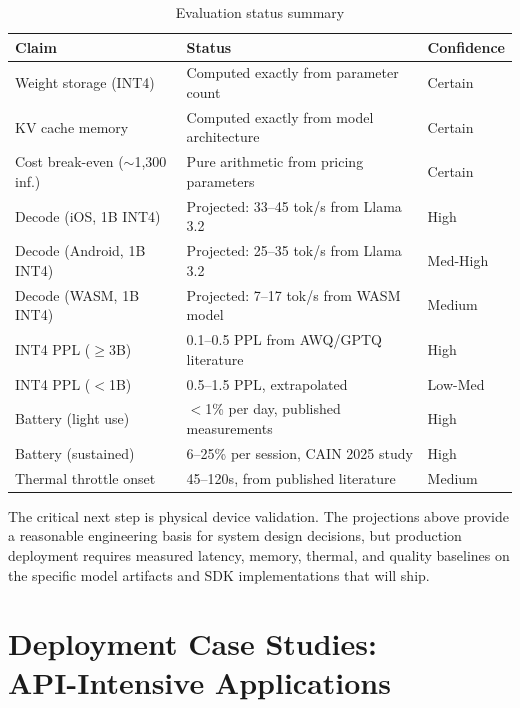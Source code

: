 \documentclass[12pt, letterpaper, twoside]{report}
\begin{document}
\begin{table}[H]
\centering
\caption{Evaluation status summary}
\label{tab:eval_summary}
{\small
\begin{tabular}{@{}p{3.6cm}p{7.0cm}l@{}}
\toprule
\textbf{Claim} & \textbf{Status} & \textbf{Confidence} \\
\midrule
Weight storage (INT4) & Computed exactly from parameter count & Certain \\[2pt]
KV cache memory & Computed exactly from model architecture & Certain \\[2pt]
Cost break-even (${\sim}$1,300 inf.) & Pure arithmetic from pricing parameters & Certain \\[2pt]
Decode (iOS, 1B INT4) & Projected: 33--45 tok/s from Llama 3.2 & High \\[2pt]
Decode (Android, 1B INT4) & Projected: 25--35 tok/s from Llama 3.2 & Med-High \\[2pt]
Decode (WASM, 1B INT4) & Projected: 7--17 tok/s from WASM model & Medium \\[2pt]
INT4 PPL (${\geq}$3B) & 0.1--0.5 PPL from AWQ/GPTQ literature & High \\[2pt]
INT4 PPL (${<}$1B) & 0.5--1.5 PPL, extrapolated & Low-Med \\[2pt]
Battery (light use) & ${<}$1\% per day, published measurements & High \\[2pt]
Battery (sustained) & 6--25\% per session, CAIN 2025 study & High \\[2pt]
Thermal throttle onset & 45--120s, from published literature & Medium \\
\bottomrule
\end{tabular}
}
\end{table}

The critical next step is physical device validation. The projections above provide a reasonable engineering basis for system design decisions, but production deployment requires measured latency, memory, thermal, and quality baselines on the specific model artifacts and SDK implementations that will ship.

\chapter[Deployment Case Studies]{Deployment Case Studies:\\ API-Intensive Applications}
\label{ch:case_studies}
\end{document}

